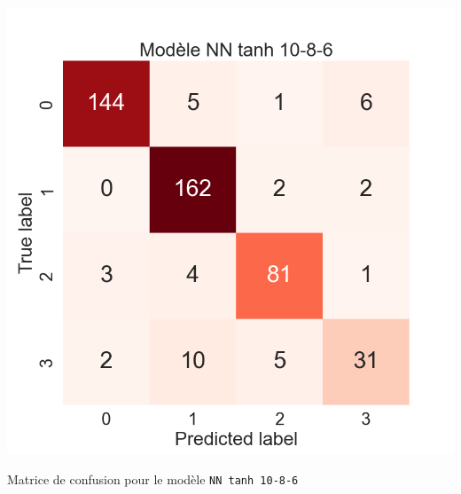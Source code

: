 \begin{table}[H]
    \includegraphics[scale=0.5]{images/y_pred_NN_tanh_10-8-6.png}
    \caption{\label{HomePage} Matrice de confusion pour le modèle \texttt{NN tanh 10-8-6}}
\end{table}

\newpage